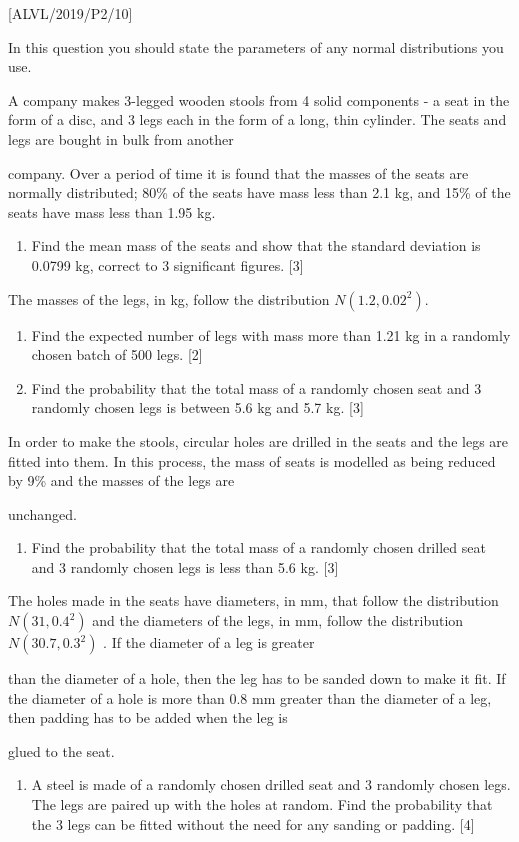 \item {[}ALVL/2019/P2/10{]} 

In this question you should state the parameters of any normal distributions
you use.

A company makes 3-legged wooden stools from 4 solid components - a
seat in the form of a disc, and 3 legs each in the form of a long,
thin cylinder. The seats and legs are bought in bulk from another

company. Over a period of time it is found that the masses of the
seats are normally distributed; 80\% of the seats have mass less than
2.1 kg, and 15\% of the seats have mass less than 1.95 kg. 
\begin{enumerate}
\item Find the mean mass of the seats and show that the standard deviation
is 0.0799 kg, correct to 3 significant figures. \hfill{} {[}3{]}
\end{enumerate}
The masses of the legs, in kg, follow the distribution $N\left(1.2,0.02^{2}\right)$. 
\begin{enumerate}
\item Find the expected number of legs with mass more than 1.21 kg in a
randomly chosen batch of 500 legs. \hfill{}{[}2{]}
\item Find the probability that the total mass of a randomly chosen seat
and 3 randomly chosen legs is between 5.6 kg and 5.7 kg. \hfill{}
{[}3{]}
\end{enumerate}
In order to make the stools, circular holes are drilled in the seats
and the legs are fitted into them. In this process, the mass of seats
is modelled as being reduced by 9\% and the masses of the legs are

unchanged. 
\begin{enumerate}
\item Find the probability that the total mass of a randomly chosen drilled
seat and 3 randomly chosen legs is less than 5.6 kg. \hfill{} {[}3{]}
\end{enumerate}
The holes made in the seats have diameters, in mm, that follow the
distribution $N\left(31,0.4^{2}\right)$ and the diameters of the
legs, in mm, follow the distribution $N\left(30.7,0.3^{2}\right)$
. If the diameter of a leg is greater

than the diameter of a hole, then the leg has to be sanded down to
make it fit. If the diameter of a hole is more than 0.8 mm greater
than the diameter of a leg, then padding has to be added when the
leg is

glued to the seat.
\begin{enumerate}
\item A steel is made of a randomly chosen drilled seat and 3 randomly chosen
legs. The legs are paired up with the holes at random. Find the probability
that the 3 legs can be fitted without the need for any sanding or
padding. \hfill{}{[}4{]}
\end{enumerate}
